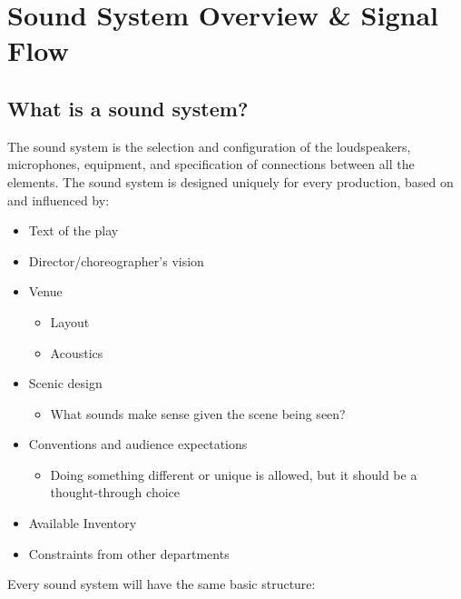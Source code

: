 \documentclass[a4paper]{article}
\begin{document}
\maketitle

\tableofcontents

\section{Sound System Overview \& Signal Flow}

\subsection{What is a sound system?}
The sound system is the selection and configuration of the loudspeakers,
microphones, equipment, and specification of connections between all the
elements. The sound system is designed uniquely for every production, based on
and influenced by:
\begin{itemize}
	\item Text of the play
	\item Director/choreographer's vision
	\item Venue
		\begin{itemize}
			\item Layout
			\item Acoustics
		\end{itemize}
	\item Scenic design
		\begin{itemize}
			\item What sounds make sense given the scene being
				seen?
		\end{itemize}
	\item Conventions and audience expectations
		\begin{itemize}
			\item Doing something different or unique is allowed,
				but it should be a thought-through choice
		\end{itemize}
	\item Available Inventory
	\item Constraints from other departments
\end{itemize}
Every sound system will have the same basic structure:
\end{document}
